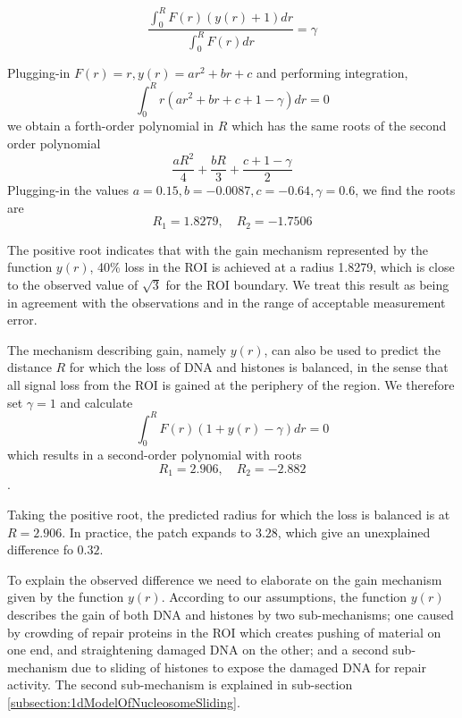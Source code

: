 \documentclass[12pt]{report}
\begin{document}
\begin{equation*}
\frac{\int_0^RF(r)(y(r)+1)dr}{\int_0^RF(r)dr} =\gamma
\end{equation*} 

Plugging-in  $F(r)=r,y(r)=ar^2 +br +c$ and performing integration, 
\begin{equation*}
\int_0^R r(ar^2 +br+c +1-\gamma)dr =0
\end{equation*}
we obtain a forth-order polynomial in $R$ which has the same roots of the second order polynomial 
\begin{equation*}
\frac{aR^2}{4} +\frac{bR}{3} +\frac{c+1-\gamma}{2}
\end{equation*}
Plugging-in the values $a=0.15, b=-0.0087,c=-0.64, \gamma=0.6$, we find the roots are 
\begin{equation*}
R_1=1.8279, \quad R_2= -1.7506
\end{equation*}

The positive root indicates that with the gain mechanism represented by the function $y(r)$, 40\% loss in the ROI is achieved at a radius 1.8279, which is close to the observed value of $\sqrt{3}$ for the ROI boundary. We treat this result as being in agreement with the observations and in the range of acceptable measurement error.

The mechanism describing gain, namely $y(r)$, can also be used to predict the distance $R$ for which the loss of DNA and histones is balanced, in the sense that all signal loss from the ROI is gained at the periphery of the region. We therefore set $\gamma =1$ and calculate
\begin{equation*}
\int_0^R F(r)(1+y(r)-\gamma)dr = 0
\end{equation*}
which results in a second-order polynomial with roots 
\begin{equation*}
R_1=2.906, \quad R_2=-2.882
\end{equation*}.

Taking the positive root, the predicted radius for which the loss is balanced is at $R=2.906$. In practice, the patch expands to $3.28$, which give an unexplained difference fo $0.32$. 

To explain the observed difference we need to elaborate on the gain mechanism given by the function $y(r)$. According to our assumptions, the function $y(r)$ describes the gain of both DNA and histones by two sub-mechanisms; one caused by crowding of repair proteins in the ROI which creates pushing of material on one end, and straightening damaged DNA on the other; and a second sub-mechanism due to sliding of histones to expose the damaged DNA for repair activity. The second sub-mechanism is explained in sub-section \ref{subsection:1dModelOfNucleosomeSliding}.  
\end{document}

